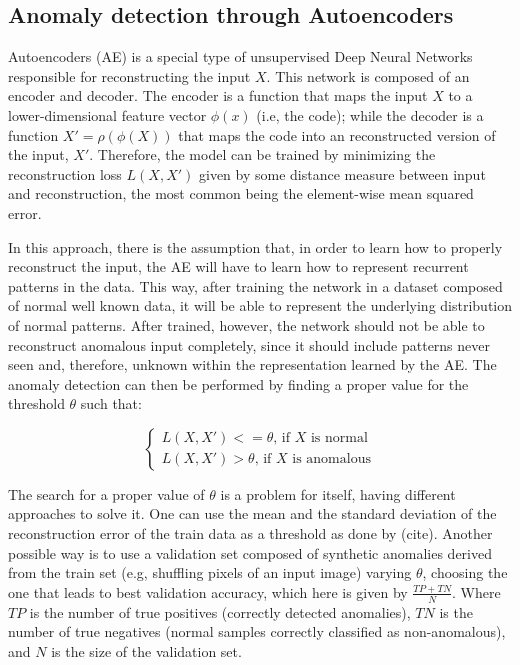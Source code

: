 \documentclass[letterpaper]{article}
\numberwithin{equation}{section}
\numberwithin{theorem}{section}
\numberwithin{lemma}{section}
\numberwithin{df}{section}
\begin{document}
\subsection{Anomaly detection through Autoencoders}

Autoencoders (AE) is a special type of unsupervised Deep Neural Networks responsible for reconstructing the input $X$. This network is composed of an encoder and decoder. The encoder is a function that maps the input $X$ to a lower-dimensional feature vector $\phi(x)$ (i.e, the code); while the decoder is a function $X' = \rho(\phi(X))$ that maps the code into an reconstructed version of the input, $X'$. Therefore, the model can be trained by minimizing the reconstruction loss $L(X, X')$ given by some distance measure between input and reconstruction, the most common being the element-wise mean squared error.

In this approach, there is the assumption that, in order to learn how to properly reconstruct the input, the AE will have to learn how to represent recurrent patterns in the data. This way, after training the network in a dataset composed of normal well known data, it will be able to represent the underlying distribution of normal patterns. After trained, however, the network should not be able to reconstruct anomalous input completely, since it should include patterns never seen and, therefore, unknown within the representation learned by the AE. The anomaly detection can then be performed by finding a proper value for the threshold $\theta$ such that:

\begin{equation}
\begin{cases}
L(X, X') <= \theta \text{, if $X$ is normal} \\
L(X, X') > \theta \text{, if $X$ is anomalous}
\end{cases}
\end{equation} 



The search for a proper value of $\theta$ is a problem for itself, having different approaches to solve it. One can use the mean and the standard deviation of the reconstruction error of the train data as a threshold as done by (cite). Another possible way is to use a validation set composed of synthetic anomalies derived from the train set (e.g, shuffling pixels of an input image) varying $\theta$, choosing the one that leads to best validation accuracy, which here is given by $\frac{TP + TN}{N}$. Where $TP$ is the number of true positives (correctly detected anomalies), $TN$ is the number of true negatives (normal samples correctly classified as non-anomalous), and $N$ is the size of the validation set.
\end{document}
